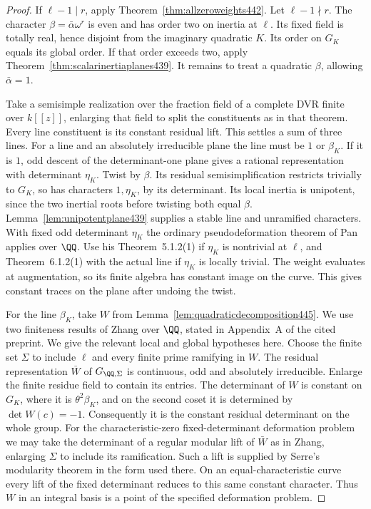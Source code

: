 \documentclass[a4paper,11pt]{article}
\theoremstyle{definition}
\theoremstyle{remark}
\numberwithin{equation}{section}
\begin{document}
\begin{proof}
If \(\ell-1\mid r\), apply Theorem~\ref{thm:allzeroweights442}.
Let \(\ell-1\nmid r\). The character
\(\beta=\bar\alpha\omega^r\) is even and has order two on inertia
at \(\ell\). Its fixed field is totally real, hence disjoint
from the imaginary quadratic \(K\). Its order on \(G_K\)
equals its global order. If that order exceeds two, apply
Theorem~\ref{thm:scalarinertiaplanes439}. It remains to treat
a quadratic \(\beta\), allowing \(\bar\alpha=1\).

Take a semisimple realization over the fraction field of a
complete DVR finite over \(k[[z]]\), enlarging that field to
split the constituents as in that theorem.
Every line constituent is its constant residual lift. This
settles a sum of three lines. For a line and an absolutely
irreducible plane the line must be \(1\) or \(\beta_K\).
If it is \(1\), odd descent of the determinant-one plane gives
a rational representation with determinant \(\eta_K\).
Twist by \(\beta\). Its residual semisimplification restricts
trivially to \(G_K\), so has characters \(1,\eta_K\), by its
determinant. Its local inertia is unipotent, since the two
inertial roots before twisting both equal \(\beta\).
Lemma~\ref{lem:unipotentplane439} supplies a stable line and
unramified characters. With fixed odd determinant \(\eta_K\)
the ordinary pseudodeformation theorem of Pan applies over
\(\QQ\). Use his Theorem~5.1.2(1) if \(\eta_K\) is nontrivial
at \(\ell\), and Theorem~6.1.2(1) with the actual line if
\(\eta_K\) is locally trivial. The weight evaluates at
augmentation, so its finite algebra has constant image on
the curve. This gives constant traces on the plane after
undoing the twist.~\cite{XI-VIII-VI-pan40}

For the line \(\beta_K\), take \(W\) from
Lemma~\ref{lem:quadraticdecomposition445}. We use two
finiteness results of Zhang over \(\QQ\), stated in Appendix~A
of the cited preprint. We give the relevant local and global
hypotheses here. Choose the finite set \(\Sigma\) to include
\(\ell\) and every finite prime ramifying in \(W\). The residual
representation \(\bar W\) of \(G_{\QQ,\Sigma}\) is continuous,
odd and absolutely irreducible. Enlarge the finite residue
field to contain its entries. The determinant of \(W\) is
constant on \(G_K\), where it is \(\theta^2\beta_K\), and on
the second coset it is determined by \(\det W(c)=-1\).
Consequently it is the constant residual determinant on the
whole group. For the characteristic-zero fixed-determinant
deformation problem we may take the determinant of a regular
modular lift of \(\bar W\) as in Zhang, enlarging \(\Sigma\)
to include its ramification. Such a lift is supplied by
Serre's modularity theorem in the form used there. On an
equal-characteristic curve every lift of the fixed determinant
reduces to this same constant character. Thus \(W\) in an
integral basis is a point of the specified deformation problem.


\end{proof}
\end{document}
